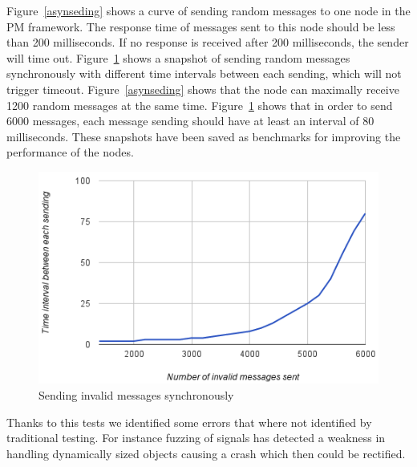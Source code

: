 Figure~\ref{asynseding} shows a curve of sending random messages to one node in the PM framework. The response time of messages sent to this node should be less than 200 milliseconds. If no response is received after 200 milliseconds, the sender will time out. Figure~\ref{synchsending} shows a snapshot of sending random messages synchronously with different time intervals between each sending, which will not trigger timeout. Figure~\ref{asynseding} shows that the node can maximally receive 1200 random messages at the same time. Figure~\ref{synchsending} shows that in order to send 6000 messages, each message sending should have at least an interval of 80 milliseconds. These snapshots have been saved as benchmarks for improving the performance of the nodes.


\begin{figure}[hh!]
\centering
\includegraphics[width=\columnwidth]{figure/synchsending.png}
\caption{Sending invalid messages synchronously \label{synchsending}}
\end{figure}

Thanks to this tests we identified some errors that where not identified by traditional testing. For instance fuzzing of signals has detected a weakness in handling dynamically sized objects causing a crash which then could be rectified.

